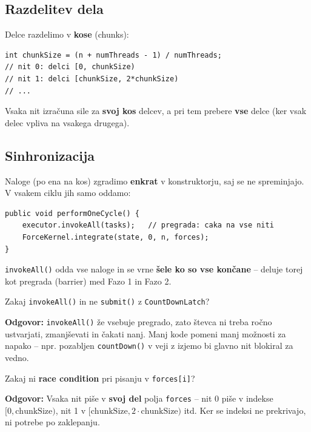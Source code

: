 \documentclass[12pt,a4paper]{article}
\begin{document}
\subsection{Razdelitev dela}

Delce razdelimo v \textbf{kose} (chunks):
\begin{lstlisting}
int chunkSize = (n + numThreads - 1) / numThreads;
// nit 0: delci [0, chunkSize)
// nit 1: delci [chunkSize, 2*chunkSize)
// ...
\end{lstlisting}

Vsaka nit izra\v{c}una sile za \textbf{svoj kos} delcev, a pri tem prebere \textbf{vse} delce (ker vsak delec vpliva na vsakega drugega).

\subsection{Sinhronizacija}

Naloge (po ena na kos) zgradimo \textbf{enkrat} v konstruktorju, saj se ne spreminjajo. V vsakem ciklu jih samo oddamo:

\begin{lstlisting}
public void performOneCycle() {
    executor.invokeAll(tasks);   // pregrada: caka na vse niti
    ForceKernel.integrate(state, 0, n, forces);
}
\end{lstlisting}

\texttt{invokeAll()} odda vse naloge in se vrne \textbf{\v{s}ele ko so vse kon\v{c}ane} -- deluje torej kot pregrada (barrier) med Fazo 1 in Fazo 2.

\begin{vprasanje}
Zakaj \texttt{invokeAll()} in ne \texttt{submit()} z \texttt{CountDownLatch}?

\textbf{Odgovor:} \texttt{invokeAll()} \v{z}e vsebuje pregrado, zato \v{s}tevca ni treba ro\v{c}no ustvarjati, zmanj\v{s}evati in \v{c}akati nanj. Manj kode pomeni manj mo\v{z}nosti za napako -- npr. pozabljen \texttt{countDown()} v veji z izjemo bi glavno nit blokiral za vedno.
\end{vprasanje}

\begin{vprasanje}
Zakaj ni \textbf{race condition} pri pisanju v \texttt{forces[i]}?

\textbf{Odgovor:} Vsaka nit pi\v{s}e v \textbf{svoj del} polja \texttt{forces} -- nit 0 pi\v{s}e v indekse $[0, \text{chunkSize})$, nit 1 v $[\text{chunkSize}, 2 \cdot \text{chunkSize})$ itd. Ker se indeksi ne prekrivajo, ni potrebe po zaklepanju.
\end{vprasanje}
\end{document}
